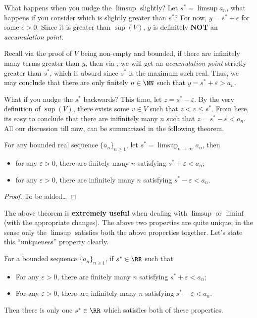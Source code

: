 \documentclass[parskip=half, numbers=endperiod, 11pt]{scrartcl}
\begin{document}
What happens when you nudge the $\limsup$ slightly?
Let $s^\ast = \limsup a_n$, what happens if you consider
which is slightly greater than $s^\ast$? For now,
$y = s^\ast + \epsilon$ for some $\epsilon > 0$. Since it
is greater than $\sup(V)$, $y$ is definitely \textbf{NOT}
an \emph{accumulation point}.

Recall via the proof of $V$ being non-empty and bounded,
if there are infinitely many terms greater than $y$,
then via , we will get
an \emph{accumulation point} strictly greater than
$s^\ast$, which is absurd since $s^\ast$ is the maximum
such real. Thus, we may conclude that there are only
finitely $n \in \NN$ such that $y = s^\ast + \varepsilon
	> a_n$.

What if you nudge the $s^\ast$ backwards? This time,
let $z = s^\ast - \varepsilon$. By the very definition
of $\sup(V)$, there exists some $v \in V$ such that
$z < v \le s^\ast$. From here, its easy to conclude that
there are inifinitely many $n$ such that
$z = s^\ast - \varepsilon < a_n$. All our discussion till
now, can be summarized in the following theorem.

\begin{theorem}
	For any bounded real sequence $\{a_n\}_{n \ge 1}$, let
	$s^\ast = \limsup_{n \to \infty} a_n$, then
	\begin{itemize}
		\item for any $\varepsilon > 0$, there are
		      finitely many $n$ satisfying
		      $s^\ast + \varepsilon < a_n$;
		\item for any $\varepsilon > 0$, there are
		      infinitely many $n$ satisfying
		      $s^\ast - \varepsilon < a_n$.
	\end{itemize}
\end{theorem}

\begin{proof}
	To be added\dots
\end{proof}

The above theorem is \textbf{extremely useful} when dealing
with $\limsup$ or $\liminf$(with the appropriate changes).
The above two properties are quite unique, in the sense
only the $\limsup$ satisfies both the above properties
together. Let's state this ``uniqueness'' property clearly.

\begin{lemma}
	For a bounded sequence $\{a_n\}_{n \ge 1}$, if
	$s^\ast \in \RR$ such that
	\begin{itemize}
		\item For any $\varepsilon > 0$, there are
		      finitely many $n$ satisfying
		      $s^\ast + \varepsilon < a_n$;
		\item For any $\varepsilon > 0$, there are
		      infinitely many $n$ satisfying
		      $s^\ast - \varepsilon < a_n$.
	\end{itemize}
	Then there is only one $s^\ast \in \RR$ which
	satisfies both of these properties.
\end{lemma}
\end{document}
